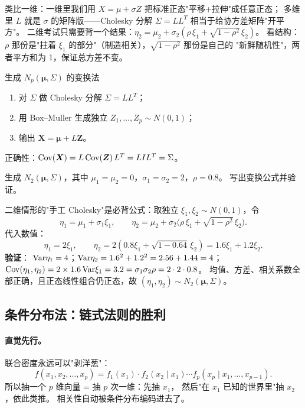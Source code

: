 \begin{pbox}
类比一维：一维里我们用 $X=\mu+\sigma Z$ 把标准正态"平移+拉伸"成任意正态；
多维里 $L$ 就是 $\sigma$ 的矩阵版——Cholesky 分解 $\Sigma=LL^T$ 相当于给协方差矩阵"开平方"。
二维考试只需要背一个结果：$\eta_2=\mu_2+\sigma_2(\rho\,\xi_1+\sqrt{1-\rho^2}\,\xi_2)$。
看结构：$\rho$ 那份是"拄着 $\xi_1$ 的部分"（制造相关），$\sqrt{1-\rho^2}$ 那份是自己的
"新鲜随机性"，两者平方和为 1，保证总方差不变。
\end{pbox}

\begin{ebox}{生成 $N_p(\bm\mu,\Sigma)$ 的变换法}
\begin{enumerate}[leftmargin=2em]
  \item 对 $\Sigma$ 做 Cholesky 分解 $\Sigma=LL^T$；
  \item 用 Box--Muller 生成独立 $Z_1,\dots,Z_p\sim N(0,1)$；
  \item 输出 $\bm X=\bm\mu+L\bm Z$。
\end{enumerate}
正确性：$\mathrm{Cov}(\bm X)=L\,\mathrm{Cov}(\bm Z)\,L^T=L I L^T=\Sigma$。
\end{ebox}

\begin{exbox}
生成 $N_2(\bm\mu,\Sigma)$，其中 $\mu_1=\mu_2=0$，$\sigma_1=\sigma_2=2$，$\rho=0.8$。
写出变换公式并验证。
\end{exbox}
\begin{sol}
二维情形的"手工 Cholesky"是必背公式：取独立 $\xi_1,\xi_2\sim N(0,1)$，令
\[
\eta_1=\mu_1+\sigma_1\xi_1,\qquad
\eta_2=\mu_2+\sigma_2\big(\rho\,\xi_1+\sqrt{1-\rho^2}\,\xi_2\big).
\]
代入数值：
\[
\eta_1=2\xi_1,\qquad
\eta_2=2(0.8\xi_1+\sqrt{1-0.64}\,\xi_2)=1.6\xi_1+1.2\xi_2 .
\]
\textbf{验证}：
$\mathrm{Var}\eta_1=4$；$\mathrm{Var}\eta_2=1.6^2+1.2^2=2.56+1.44=4$；
$\mathrm{Cov}(\eta_1,\eta_2)=2\times1.6\,\mathrm{Var}\xi_1=3.2=\sigma_1\sigma_2\rho=2\cdot2\cdot0.8$。
均值、方差、相关系数全部正确，且正态线性组合仍正态，故 $(\eta_1,\eta_2)\sim N_2(\bm\mu,\Sigma)$。
\end{sol}

\subsection{条件分布法：链式法则的胜利}

\paragraph{直觉先行。}
联合密度永远可以"剥洋葱"：
\[
f(x_1,x_2,\dots,x_p)=f_1(x_1)\cdot f_2(x_2\mid x_1)\cdots f_p(x_p\mid x_1,\dots,x_{p-1}).
\]
所以抽一个 $p$ 维向量 = 抽 $p$ 次一维：先抽 $x_1$，
然后"在 $x_1$ 已知的世界里"抽 $x_2$，依此类推。
相关性自动被条件分布编码进去了。

